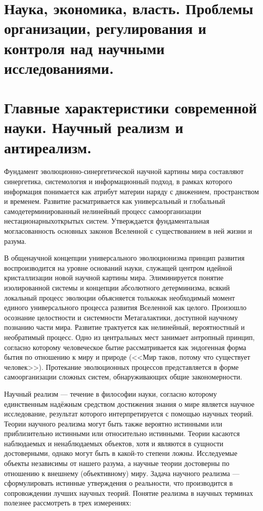 \documentclass[12pt, specialist, subf, substylefile = spbu.rtx]{disser}
\begin{document}
\section{Наука, экономика, власть. Проблемы организации, регулирования и контроля над научными исследованиями.}

\section{Главные характеристики современной  науки. Научный реализм и антиреализм.}
Фундамент эволюционно-синергетической научной картины мира составляют синергетика, системология и информационный подход, в рамках которого информация понимается как атрибут материи наряду с движением, пространством и временем. Развитие расматривается как универсальный и глобальный самодетерминированный нелинейный процесс самоорганизации нестационарныхоткрытых систем. Утверждается фундаментальная могласованность основных законов Вселенной с существованием в ней жизни и разума.

В общенаучной концепции универсального эволюционизма принцип развития воспроизводится на уровне оснований науки, служащей центром идейной кристаллизации новой научной картины мира. Элиминируется понятие изолированной системы и концепции абсолютного детерминизма, всякий локальный процесс эволюции объясняется толькокак необходимый момент единого универсального процесса развития Вселенной как целого. Произошло осознание целостности и системности Метагалактики, доступной научному познанию части мира. Развитие трактуется как нелинейный, вероятностный и необратимый процесс. Одно из центральных мест занимает антропный принцип, согласно которому человеческое бытие рассматривается как эндогенная форма бытия по отношению к миру и природе (<<Мир таков, потому что существует человек>>). Протекание эволюционных процессов представляется в форме самоорганизации сложных систем, обнаруживающих общие закономерности.

Научный реализм — течение в философии науки, согласно которому единственным надёжным средством достижения знания о мире является научное исследование, результат которого интерпретируется с помощью научных теорий. Теории научного реализма могут быть также вероятно истинными или приблизительно истинными или относительно истинными. Теории касаются наблюдаемых и ненаблюдаемых объектов, хотя и являются в сущности достоверными, однако могут быть в какой-то степени ложны. Исследуемые объекты независимы от нашего разума, а научные теории достоверны по отношению к внешнему (объективному) миру. Задача научного реализма — сформулировать истинные утверждения о реальности, что производится в сопровождении лучших научных теорий. Понятие реализма в научных терминах полезнее рассмотреть в трех измерениях:
\end{document}
